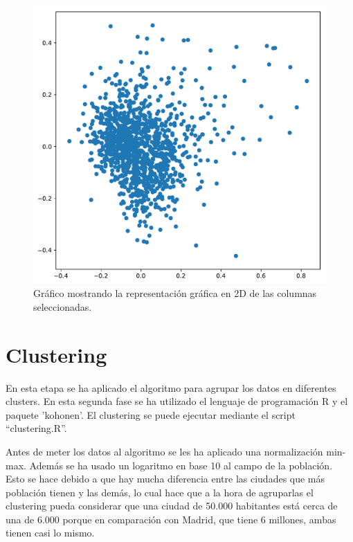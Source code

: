 \documentclass[acmtog, screen]{acmart}
\begin{document}
\begin{figure}
	\includegraphics[width=\columnwidth]{pca}
	\caption{Gráfico mostrando la representación gráfica en 2D de las columnas seleccionadas.}
	\label{fig:pca}
\end{figure}

\section{Clustering}
En esta etapa se ha aplicado el algoritmo para agrupar los datos en diferentes clusters. En esta segunda fase se ha utilizado el lenguaje de programación R y el paquete 'kohonen'. El clustering se puede ejecutar mediante el script ``clustering.R''.

Antes de meter los datos al algoritmo se les ha aplicado una normalización min-max. Además se ha usado un logaritmo en base 10 al campo de la población. Esto se hace debido a que hay mucha diferencia entre las ciudades que más población tienen y las demás, lo cual hace que a la hora de agruparlas el clustering pueda considerar que una ciudad de 50.000 habitantes está cerca de una de 6.000 porque en comparación con Madrid, que tiene 6 millones, ambas tienen casi lo mismo.
\end{document}
